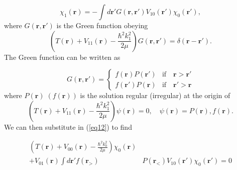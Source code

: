 \documentclass[a4paper,11pt]{article}
\begin{document}
\begin{equation}\label{eq8}
\chi_1(\mathbf{r})=-\int d\mathbf{r}'G(\mathbf{r},\mathbf{r}')V_{10}(\mathbf{r}')\chi_0(\mathbf{r}'),
\end{equation}
where $G(\mathbf{r},\mathbf{r}')$ is the Green function obeying
\begin{equation}\label{eq9}
 \left(T(\mathbf{r})+V_{11}(\mathbf{r})-\frac{\hbar^2k_1^2}{2 \mu}\right)G(\mathbf{r},\mathbf{r}')=\delta(\mathbf{r}-\mathbf{r}').
\end{equation}
The Green function can be written as

\begin{equation}\label{eq10}
G(\mathbf{r},\mathbf{r}')=\left\{\begin{array}{cc}
                                   f(\mathbf{r})P(\mathbf{r}') & \text{if}\quad \mathbf{r}>\mathbf{r}' \\
                                   f(\mathbf{r}')P(\mathbf{r}) & \text{if} \quad \mathbf{r}'>\mathbf{r}
                                 \end{array}
\right.
\end{equation}
where $P(\mathbf{r})\;(f(\mathbf{r}))$ is the solution  regular (irregular) at the origin of
\begin{equation}\label{eq11}
 \left(T(\mathbf{r})+V_{11}(\mathbf{r})-\frac{\hbar^2k_1^2}{2 \mu}\right)\psi(\mathbf{r})=0, \quad \psi(\mathbf{r})=P(\mathbf{r}),f(\mathbf{r}).
\end{equation}
We can then substitute in (\ref{eq12}) to find

\begin{align}\label{eq13}
\nonumber \left(T(\mathbf{r})+V_{00}(\mathbf{r})-\frac{\hbar^2k_0^2}{2 \mu}\right)\chi_0(\mathbf{r})
 \\+V_{01}(\mathbf{r})\int d\mathbf{r}' f(\mathbf{r}_>)&P(\mathbf{r}_<)V_{10}(\mathbf{r}')\chi_0(\mathbf{r}')=0
\end{align}
\end{document}
